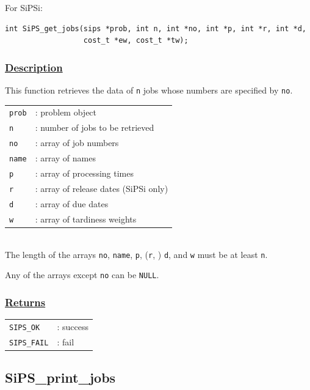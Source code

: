 \documentclass[a4paper]{book}
\begin{document}
\noindent
For SiPSi:

\begin{verbatim}
int SiPS_get_jobs(sips *prob, int n, int *no, int *p, int *r, int *d,
                  cost_t *ew, cost_t *tw);
\end{verbatim}


\subsubsection{\underline{Description}}

This function retrieves the data of \verb+n+ jobs whose numbers are specified by \verb+no+.

\begin{tabular}{ll}
  \verb+prob+ &: problem object\\
  \verb+n+    &: number of jobs to be retrieved\\
  \verb+no+   &: array of job numbers\\
  \verb+name+ &: array of names\\
  \verb+p+    &: array of processing times\\
  \verb+r+    &: array of release dates (SiPSi only)\\
  \verb+d+    &: array of due dates\\
  \verb+w+    &: array of tardiness weights\\
\end{tabular}\\

\noindent
The length of the arrays \verb+no+, \verb+name+, \verb+p+, (\verb+r+, ) \verb+d+, and \verb+w+ must be at least \verb+n+.

Any of the arrays except \verb+no+ can be \verb+NULL+.

\subsubsection{\underline{Returns}}

\begin{tabular}{ll}
  \verb+SIPS_OK+  &: success\\
  \verb+SIPS_FAIL+&: fail\\
\end{tabular}

\hypertarget{SiPS_print_jobs}{%
\subsection{SiPS\_print\_jobs}
}
\end{document}
